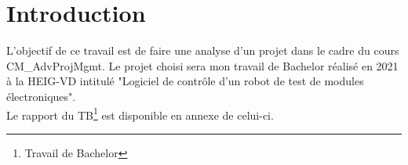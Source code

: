 \documentclass[AdvProjMgmt_Sebastien_Deriaz]{subfiles}
\begin{document}
\section{Introduction}
L'objectif de ce travail est de faire une analyse d'un projet dans le cadre du cours CM\_AdvProjMgmt. Le projet choisi sera mon travail de Bachelor réalisé en 2021 à la HEIG-VD intitulé "Logiciel de contrôle d’un robot de test de modules électroniques".\\
Le rapport du TB\footnote{Travail de Bachelor} est disponible en annexe de celui-ci.\\
\end{document}
